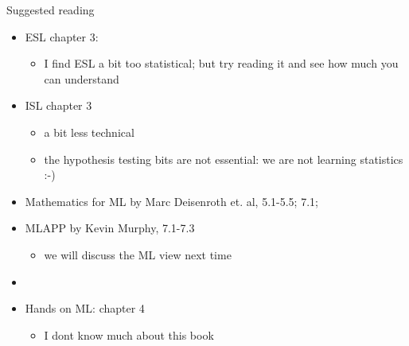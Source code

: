 \documentclass[ignorenonframetext,]{beamer}
\providecommand{\tightlist}{%
  \setlength{\itemsep}{0pt}\setlength{\parskip}{0pt}}
\begin{document}
\begin{frame}{Suggested reading}
\protect\hypertarget{suggested-reading}{}

\begin{itemize}
\item
  ESL chapter 3:

  \begin{itemize}
  \tightlist
  \item
    I find ESL a bit too statistical; but try reading it and see how
    much you can understand
  \end{itemize}
\item
  ISL chapter 3

  \begin{itemize}
  \tightlist
  \item
    a bit less technical
  \item
    the hypothesis testing bits are not essential: we are not learning
    statistics :-)
  \end{itemize}
\item
  Mathematics for ML by Marc Deisenroth et. al, 5.1-5.5; 7.1;
\item
  MLAPP by Kevin Murphy, 7.1-7.3

  \begin{itemize}
  \tightlist
  \item
    we will discuss the ML view next time
  \end{itemize}
\item
\item
  Hands on ML: chapter 4

  \begin{itemize}
  \tightlist
  \item
    I dont know much about this book
  \end{itemize}
\end{itemize}

\end{frame}
\end{document}

